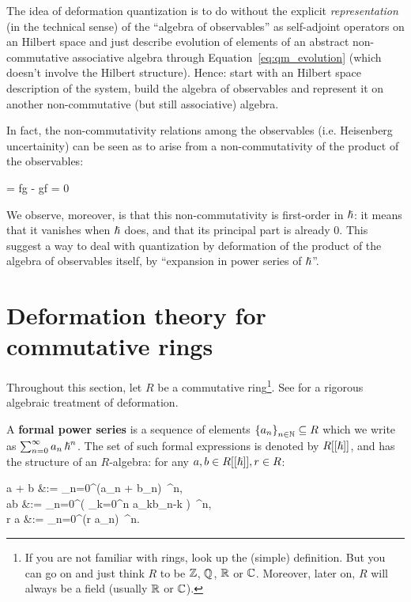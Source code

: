 \documentclass[main.tex]{subfiles}
\begin{document}
The idea of deformation quantization is to do without the explicit \emph{representation} (in the technical sense) of the ``algebra of observables'' as self-adjoint operators on an Hilbert space and just describe evolution of elements of an abstract non-commutative associative algebra through Equation~\eqref{eq:qm_evolution} (which doesn't involve the Hilbert structure). Hence: start with an Hilbert space description of the system, build the algebra of observables and represent it on another non-commutative (but still associative) algebra.

In fact, the non-commutativity relations among the observables (i.e. Heisenberg uncertainity) can be seen as to arise from a non-commutativity of the product of the observables:
\begin{eqalign}
	[f,g] = fg - gf = 0 \iff {}
\end{eqalign}
We observe, moreover, is that this non-commutativity is first-order in ${\boldsymbol\hslash}$: it means that it vanishes when ${\boldsymbol\hslash}$ does, and that its principal part is already $0$. This suggest a way to deal with quantization by deformation of the product of the algebra of observables itself, by ``expansion in power series of ${\boldsymbol\hslash}$''.

\section{Deformation theory for commutative rings}
Throughout this section, let $R$ be a commutative ring\footnote{If you are not familiar with rings, look up the (simple) definition. But you can go on and just think $R$ to be $\mathbb{Z}$, $\mathbb{Q}$, $\mathbb{R}$ or $\mathbb{C}$. Moreover, later on, $R$ will always be a field (usually $\mathbb{R}$ or $\mathbb{C}$).}. See \cite{gerstenhaber1964deformation} for a rigorous algebraic treatment of deformation.

\begin{definition}
	A \textbf{formal power series} is a sequence of elements $\left\{a_{n}\right\}_{n \in \mathbb{N}} \subseteq R$ which we write as $\sum_{n=0}^\infty a_n\, {\boldsymbol\hslash}^n$. The set of such formal expressions is denoted by $R[[{\boldsymbol\hslash}]]$, and has the structure of an $R$-algebra: for any $a,b \in R[[{\boldsymbol\hslash}]], r \in R$:
	\begin{eqalign}
		a + b &:= \sum_{n=0}^\infty (a_n + b_n)\, \planck^n,\\
		\label{eq:power_series_product}
		ab &:= \sum_{n=0}^\infty \left( \sum_{k=0}^n a_kb_{n-k} \right) \,\planck^n,\\
		r \cdot a &:= \sum_{n=0}^\infty (r \cdot a_n) \,\planck^n.
	\end{eqalign}
\end{definition}
\end{document}

